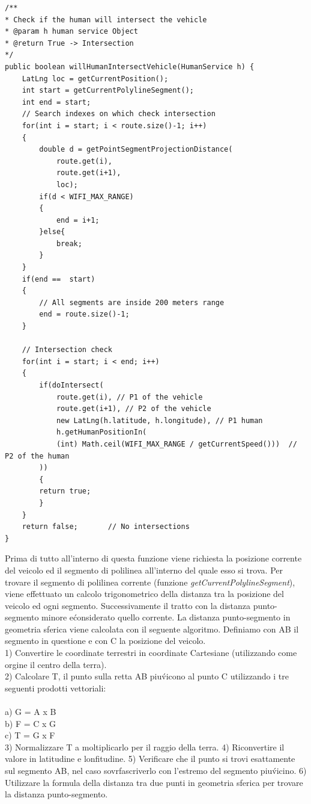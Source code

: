 \documentclass[conference]{IEEEtran}
\begin{document}
\begin{lstlisting}
/**
* Check if the human will intersect the vehicle
* @param h human service Object
* @return True -> Intersection
*/
public boolean willHumanIntersectVehicle(HumanService h) {
	LatLng loc = getCurrentPosition();
	int start = getCurrentPolylineSegment();
	int end = start;
	// Search indexes on which check intersection
	for(int i = start; i < route.size()-1; i++)
	{
		double d = getPointSegmentProjectionDistance(
			route.get(i),
			route.get(i+1),
			loc);
		if(d < WIFI_MAX_RANGE)
		{
			end = i+1;
		}else{
			break;
		}
	}
	if(end ==  start)
	{
		// All segments are inside 200 meters range
		end = route.size()-1;
	}

	// Intersection check
	for(int i = start; i < end; i++)
	{
		if(doIntersect(
			route.get(i), // P1 of the vehicle
			route.get(i+1), // P2 of the vehicle
			new LatLng(h.latitude, h.longitude), // P1 human
			h.getHumanPositionIn(
			(int) Math.ceil(WIFI_MAX_RANGE / getCurrentSpeed()))  // P2 of the human
		))
		{
		return true;
		}
	}
	return false;       // No intersections
}

\end{lstlisting}
Prima di tutto all'interno di questa funzione viene richiesta la posizione corrente del veicolo ed il segmento di polilinea all'interno del quale esso si trova.
Per trovare il segmento di polilinea corrente (funzione \textit{getCurrentPolylineSegment}), viene effettuato un calcolo trigonometrico della distanza tra la posizione del veicolo ed ogni segmento. Successivamente il tratto con la distanza punto-segmento minore e\' considerato quello corrente.
La distanza punto-segmento in geometria sferica viene calcolata con il seguente algoritmo.
Definiamo con AB il segmento in questione e con C la posizione del veicolo.\\
1) Convertire le coordinate terrestri in coordinate Cartesiane (utilizzando come orgine il centro della terra).\\
2) Calcolare T, il punto sulla retta AB piu\' vicono al  punto C utilizzando i tre seguenti prodotti vettoriali:
\\\\	a) G = A x B\\

	b) F = C x G\\

	c) T = G x F\\

3) Normalizzare T a moltiplicarlo per il raggio della terra.
4) Riconvertire il valore in latitudine e lonfitudine.
5) Verificare che il punto si trovi esattamente sul segmento AB, nel caso sovrfascriverlo con l'estremo del segmento piu\' vicino.
6) Utilizzare la formula della distanza tra due punti in geometria sferica per trovare la distanza punto-segmento.
\end{document}
